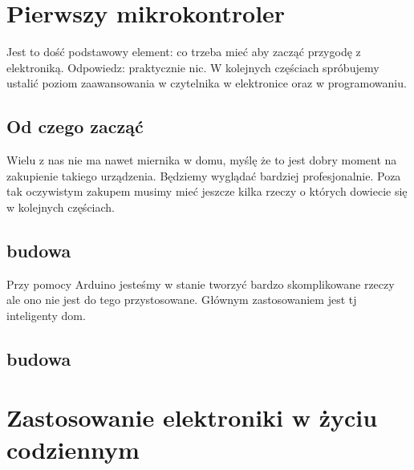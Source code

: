 \documentclass[a4paper,12pt, twoside]{article}
\let\oldsection\section		%
\renewcommand\section{\clearpage\oldsection}%
\begin{document}
       
        

\section{Pierwszy mikrokontroler}
		Jest to dość podstawowy element: co trzeba mieć aby zacząć przygodę z elektroniką. Odpowiedz: praktycznie nic. W kolejnych częściach spróbujemy ustalić poziom zaawansowania w czytelnika w elektronice oraz w programowaniu.




		\subsection {Od czego zacząć}
			Wielu z nas nie ma nawet miernika w domu, myślę że to jest dobry moment na zakupienie takiego urządzenia. Będziemy wyglądać bardziej profesjonalnie. Poza tak oczywistym zakupem musimy mieć jeszcze kilka rzeczy o których dowiecie się w kolejnych częściach.
	\subsection{budowa}
	Przy pomocy Arduino jesteśmy w stanie tworzyć bardzo skomplikowane rzeczy ale ono nie jest do tego przystosowane. Głównym zastosowaniem jest tj inteligenty dom.
	\subsection{budowa}

\section {Zastosowanie elektroniki w życiu codziennym }
\end{document}
